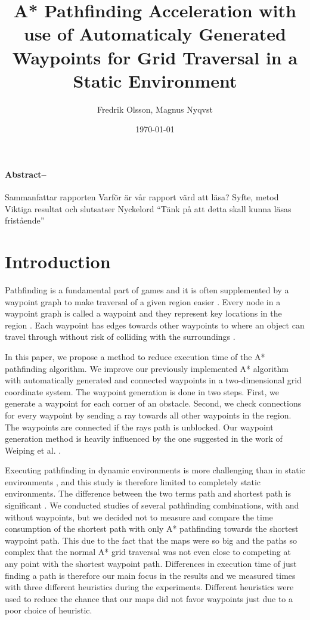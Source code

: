 \documentclass[a4paper]{article}
\title{\Huge A* Pathfinding Acceleration with use of Automaticaly Generated Waypoints for Grid Traversal in a Static Environment}
\author{Fredrik Olsson, Magnus Nyqvst}
\date{\today}
\begin{document}
\maketitle
\newpage
\thispagestyle{empty}
\paragraph{Abstract--}
Sammanfattar rapporten
Varför är vår rapport värd att läsa?
Syfte, metod
Viktiga resultat och slutsatser Nyckelord
“Tänk på att detta skall kunna läsas fristående”

\tableofcontents
\listoffigures
\newpage
{}
\twocolumn
\section{Introduction}
Pathfinding is a fundamental part of games \cite{dynaPF15}\cite{roboGame15} and it is often supplemented by a waypoint graph to make traversal of a given region easier \cite{dynaPF15}. Every node in a waypoint graph is called a waypoint and they represent key locations in the region \cite{dynaPF15}. Each waypoint has edges towards other waypoints to where an object can travel through without risk of colliding with the surroundings \cite{dynaPF15}.
	
In this paper, we propose a method to reduce execution time of the A* pathfinding algorithm. We improve our previously implemented A* algorithm with automatically generated and connected waypoints in a two-dimensional grid coordinate system. The waypoint generation is done in two steps. First, we generate a waypoint for each corner of an obstacle. Second, we check connections for every waypoint by sending a ray towards all other waypoints in the region. The waypoints are connected if the rays path is unblocked. Our waypoint generation method is heavily influenced by the one suggested in the work of Weiping et al. \cite{dynaPF15}.
	
Executing pathfinding in dynamic environments is more challenging than in static environments \cite{dynaPF15}, and this study is therefore limited to completely static environments. The difference between the two terms path and shortest path is significant \cite{heuristicGame15}. We conducted studies of several pathfinding combinations, with and without waypoints, but we decided not to measure and compare the time consumption of the shortest path with only A* pathfinding towards the shortest waypoint path. This due to the fact that the maps were so big and the paths so complex that the normal A* grid traversal was not even close to competing at any point with the shortest waypoint path. Differences in execution time of just finding a path is therefore our main focus in the results and we measured times with three different heuristics during the experiments. Different heuristics were used to reduce the chance that our maps did not favor waypoints just due to a poor choice of heuristic.
\end{document}
